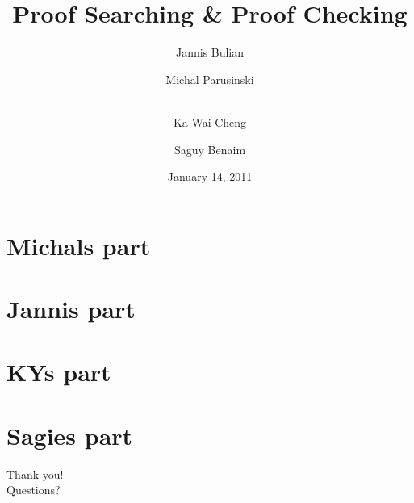 \documentclass[usenames,dvipsnames]{beamer}
\title{Proof Searching \& Proof Checking}
\author[Jannis Bulian \and\\ Michal Parusinski \and\\ Ka Wai Cheng \and\\ Saguy Benaim]{Jannis Bulian \and Michal Parusinski \and \\ Ka Wai Cheng \and Saguy Benaim}
\date{January 14, 2011}
\institute{Imperial College London\\
           Department of Computing}
\begin{document}
\maketitle
\tableofcontents

\section{Michals part}

\section{Jannis part}

\section{KYs part}

\section{Sagies part}


\appendix

\begin{frame}
  \begin{center}
    {\Huge Thank you! \\}
    \vspace{1cm}
    {\Huge Questions?}
  \end{center}
\end{frame}

\begin{frame}
  
  
\end{frame}
\end{document}
